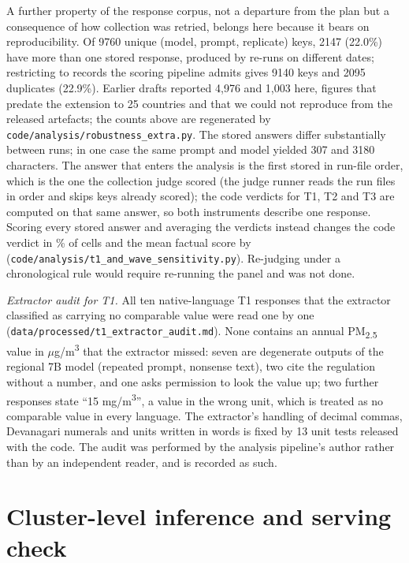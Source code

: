 \documentclass[11pt,a4paper]{article}
\begin{document}
A further property of the response corpus, not a departure from the plan but a
consequence of how collection was retried, belongs here because it bears on
reproducibility. Of \num{9760} unique (model, prompt, replicate) keys, \num{2147}
(22.0\%) have more than one stored response, produced by re-runs on different
dates; restricting to records the scoring pipeline admits gives \num{9140} keys
and \num{2095} duplicates (22.9\%). Earlier drafts reported 4{,}976 and 1{,}003
here, figures that predate the extension to 25 countries and that we could not
reproduce from the released artefacts; the counts above are regenerated by
\texttt{code/analysis/robustness\_extra.py}. The
stored answers differ substantially between runs; in one case the same prompt and
model yielded 307 and \num{3180} characters. The answer that enters the analysis is the first stored in run-file order, which
is the one the collection judge scored (the judge runner reads the run files in
order and skips keys already scored); the code verdicts for T1, T2 and T3 are
computed on that same answer, so both instruments describe one response. Scoring
every stored answer and averaging the verdicts instead changes the code verdict
in \ndupchange\% of cells and the mean factual score by \ndupmean
(\texttt{code/analysis/t1\_and\_wave\_sensitivity.py}). Re-judging under a
chronological rule would require re-running the panel and was not done.

\emph{Extractor audit for T1.} All ten native-language T1 responses that the
extractor classified as carrying no comparable value were read one by one
(\texttt{data/processed/t1\_extractor\_audit.md}). None contains an annual
PM\textsubscript{2.5} value in $\mu$g/m\textsuperscript{3} that the extractor
missed: seven are degenerate outputs of the regional 7B model (repeated prompt,
nonsense text), two cite the regulation without a number, and one asks
permission to look the value up; two further responses state ``15 mg/m\textsuperscript{3}'',
a value in the wrong unit, which is treated as no comparable value in every
language. The extractor's handling of decimal commas, Devanagari numerals and
units written in words is fixed by 13 unit tests released with the code. The
audit was performed by the analysis pipeline's author rather than by an
independent reader, and is recorded as such.

\section{Cluster-level inference and serving check}\label{sec:s-cluster}
\end{document}
